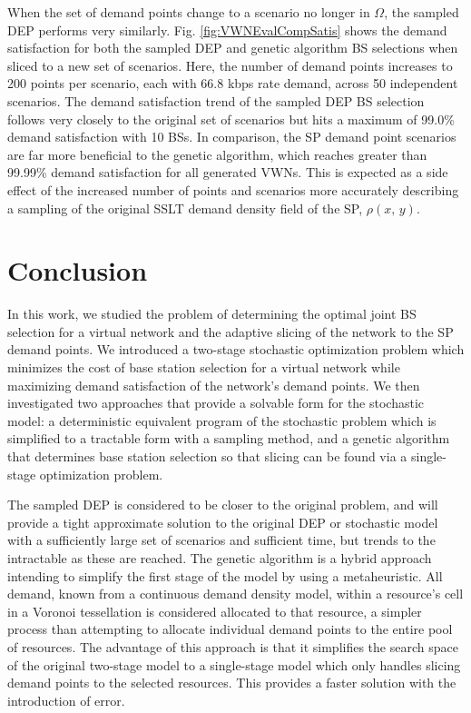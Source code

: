 \documentclass[onecolumn,draftcls]{IEEEtran}
\begin{document}
When the set of demand points change to a scenario no longer in $\Omega$, the sampled DEP performs very similarly.  Fig. \ref{fig:VWNEvalCompSatis} shows the demand satisfaction for both the sampled DEP and genetic algorithm BS selections when sliced to a new set of scenarios.  Here, the number of demand points increases to 200 points per scenario, each with 66.8 kbps rate demand, across 50 independent scenarios.  The demand satisfaction trend of the sampled DEP BS selection follows very closely to the original set of scenarios but hits a maximum of 99.0\% demand satisfaction with 10 BSs.  In comparison, the SP demand point scenarios are far more beneficial to the genetic algorithm, which reaches greater than 99.99\% demand satisfaction for all generated VWNs.  This is expected as a side effect of the increased number of points and scenarios more accurately describing a sampling of the original SSLT demand density field of the SP, $\rho\left(x,\, y\right)$.

\section{Conclusion} \label{sec:conclusion}

In this work, we studied the problem of determining the optimal joint BS selection for a virtual network and the adaptive slicing of the network to the SP demand points.  We introduced a two-stage stochastic optimization problem which minimizes the cost of base station selection for a virtual network while maximizing demand satisfaction of the network's demand points.  We then investigated two approaches that provide a solvable form for the stochastic model: a deterministic equivalent program of the stochastic problem which is simplified to a tractable form with a sampling method, and a genetic algorithm that determines base station selection so that slicing can be found via a single-stage optimization problem.

The sampled DEP is considered to be closer to the original problem, and will provide a tight approximate solution to the original DEP or stochastic model with a sufficiently large set of scenarios and sufficient time, but trends to the intractable as these are reached.  The genetic algorithm is a hybrid approach intending to simplify the first stage of the model by using a metaheuristic.  All demand, known from a continuous demand density model, within a resource's cell in a Voronoi tessellation is considered allocated to that resource, a simpler process than attempting to allocate individual demand points to the entire pool of resources.  The advantage of this approach is that it simplifies the search space of the original two-stage model to a single-stage model which only handles slicing demand points to the selected resources.  This provides a faster solution with the introduction of error.
\end{document}
